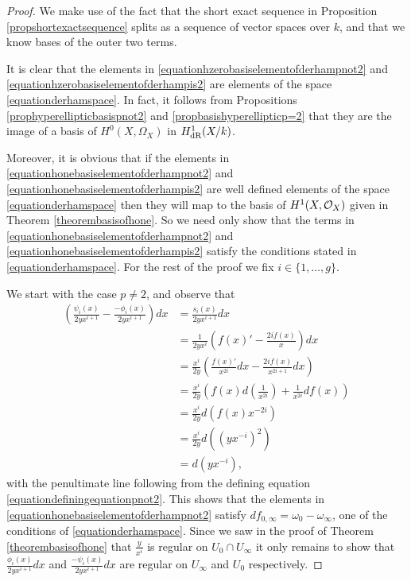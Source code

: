     \begin{proof}
    We make use of the fact that the short exact sequence in Proposition \ref{propshortexactsequence} splits as a sequence of vector spaces over $k$, and that we know bases of the outer two terms.
    
    It is clear that the elements in \eqref{equationhzerobasiselementofderhampnot2} and \eqref{equationhzerobasiselementofderhampis2} are elements of the space \eqref{equationderhamspace}. 
    In fact, it follows from Propositions \ref{prophyperellipticbasispnot2} and \ref{propbasishyperellipticp=2} that they are the image of a basis of $H^0(X,\Omega_X)$ in $H_{\text {dR}}^1(X/k)$.
    
    Moreover, it is obvious that if the elements in \eqref{equationhonebasiselementofderhampnot2} and \eqref{equationhonebasiselementofderhampis2} are well defined elements of the space \eqref{equationderhamspace} then they will map to the basis of $H^1(X,\mathcal{O}_X)$ given in Theorem \ref{theorembasisofhone}.
    So we need only show that the terms in \eqref{equationhonebasiselementofderhampnot2} and \eqref{equationhonebasiselementofderhampis2} satisfy the conditions stated in \eqref{equationderhamspace}.
    For the rest of the proof we fix $i \in \{1, \ldots ,g\}$.
    
    
    We start with the case $p\neq 2$, and observe that
        \begin{align*}
        \left(  \frac{\psi_i(x)}{2yx^{i+1}}  - \frac{-\phi_i(x)}{2yx^{i+1}} \right) dx & =  \frac{s_i(x)}{2yx^{i+1}} dx \\
        & =  \frac{1}{2yx^i} \left( f(x)' - \frac{2if(x)}{x} \right) dx \\
        & =  \frac{x^i}{2y} \left( \frac{f(x)'}{x^{2i}}dx -\frac{2if(x)}{x^{2i+1}} dx \right) \\
        & =  \frac{x^i}{2y} \left( f(x)d\left(\frac{1}{x^{2i}}\right) + \frac{1}{x^{2i}}df(x) \right) \\
        & =  \frac{x^i}{2y}d(f(x)x^{-2i}) \\
        & =  \frac{x^i}{2y} d\left(\left(yx^{-i}\right)^2\right) \\
        & =  d(yx^{-i}),
        \end{align*}
    with the penultimate line following from the defining equation \eqref{equationdefiningequationpnot2}.
    This shows that the elements in \eqref{equationhonebasiselementofderhampnot2} satisfy $df_{0, \infty} = \omega_0 - \omega_\infty$, one of the conditions of \eqref{equationderhamspace}.
    Since we saw in the proof of Theorem \ref{theorembasisofhone} that $\frac{y}{x^i}$ is regular on $U_0\cap U_\infty$ it only remains to show that $\frac{\phi_i(x)}{2yx^{i+1}}dx$ and $\frac{-\psi_i(x)}{2yx^{i+1}}dx$ are regular on $U_\infty$ and $U_0$ respectively.
    

\end{proof}
